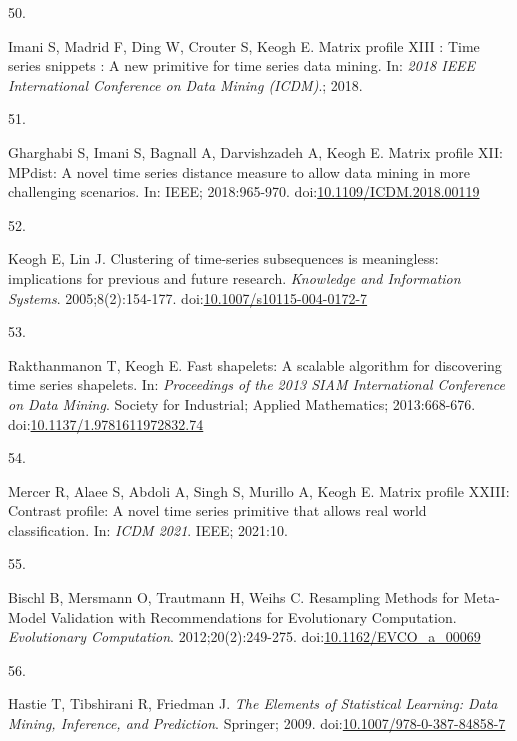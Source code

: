\documentclass[12pt,twoside]{fmupthesis}
\newlength{\csllabelwidth}
\newlength{\cslhangindent}
\newenvironment{CSLReferences}[2] %
 {%
  \setlength{\parindent}{0pt}
  \ifodd #1 \everypar{\setlength{\hangindent}{\cslhangindent}}\ignorespaces\fi
  \ifnum #2 > 0
  \setlength{\parskip}{#2\baselineskip}
  \fi
 }%
 {}
\newcommand{\CSLLeftMargin}[1]{\parbox[t]{\csllabelwidth}{#1}}
\newcommand{\CSLRightInline}[1]{\parbox[t]{\linewidth - \csllabelwidth}{#1}}
\begin{document}
\begin{CSLReferences}{0}{0}
\leavevmode{}%
\CSLLeftMargin{50. }
\CSLRightInline{Imani S, Madrid F, Ding W, Crouter S, Keogh E. Matrix profile XIII : Time series snippets : A new primitive for time series data mining. In: \emph{2018 IEEE International Conference on Data Mining (ICDM)}.; 2018.}

\leavevmode{}%
\CSLLeftMargin{51. }
\CSLRightInline{Gharghabi S, Imani S, Bagnall A, Darvishzadeh A, Keogh E. Matrix profile XII: MPdist: A novel time series distance measure to allow data mining in more challenging scenarios. In: IEEE; 2018:965-970. doi:\href{https://doi.org/10.1109/ICDM.2018.00119}{10.1109/ICDM.2018.00119}}

\leavevmode{}%
\CSLLeftMargin{52. }
\CSLRightInline{Keogh E, Lin J. {Clustering of time-series subsequences is meaningless: implications for previous and future research}. \emph{Knowledge and Information Systems}. 2005;8(2):154-177. doi:\href{https://doi.org/10.1007/s10115-004-0172-7}{10.1007/s10115-004-0172-7}}

\leavevmode{}%
\CSLLeftMargin{53. }
\CSLRightInline{Rakthanmanon T, Keogh E. Fast shapelets: A scalable algorithm for discovering time series shapelets. In: \emph{Proceedings of the 2013 SIAM International Conference on Data Mining}. Society for Industrial; Applied Mathematics; 2013:668-676. doi:\href{https://doi.org/10.1137/1.9781611972832.74}{10.1137/1.9781611972832.74}}

\leavevmode{}%
\CSLLeftMargin{54. }
\CSLRightInline{Mercer R, Alaee S, Abdoli A, Singh S, Murillo A, Keogh E. Matrix profile XXIII: Contrast profile: A novel time series primitive that allows real world classification. In: \emph{ICDM 2021}. IEEE; 2021:10.}

\leavevmode{}%
\CSLLeftMargin{55. }
\CSLRightInline{Bischl B, Mersmann O, Trautmann H, Weihs C. {Resampling Methods for Meta-Model Validation with Recommendations for Evolutionary Computation}. \emph{Evolutionary Computation}. 2012;20(2):249-275. doi:\href{https://doi.org/10.1162/EVCO_a_00069}{10.1162/EVCO\_a\_00069}}

\leavevmode{}%
\CSLLeftMargin{56. }
\CSLRightInline{Hastie T, Tibshirani R, Friedman J. \emph{{The Elements of Statistical Learning: Data Mining, Inference, and Prediction}}. Springer; 2009. doi:\href{https://doi.org/10.1007/978-0-387-84858-7}{10.1007/978-0-387-84858-7}}


\end{CSLReferences}
\end{document}
